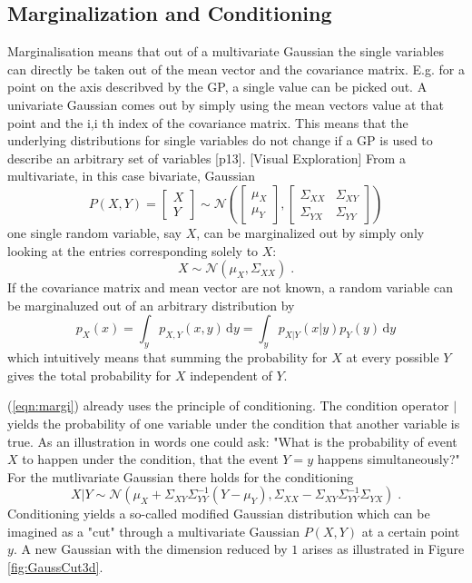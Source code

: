 \documentclass[%
  a4paper,oneside,%
  11pt,%
  smallchapters,
  green,%
  rgb, <cmyk>
  ,]{tubsbook}
\begin{document}
\subsection{Marginalization and Conditioning} 
Marginalisation means that out of a multivariate Gaussian the single variables can directly be taken out of the mean vector and the covariance matrix. E.g. for a point on the axis describved by the GP, a single value can be picked out. A univariate Gaussian comes out by simply using the mean vectors value at that point and the i,i th index of the covariance matrix. This means that the underlying distributions for single variables do not change if a GP is used to describe an arbitrary set of variables [p13].
[Visual Exploration]
From a multivariate, in this case bivariate, Gaussian
\begin{equation}
P(X,Y) = \begin{bmatrix}
           X \\
           Y
         \end{bmatrix} \sim \mathcal{N}\left( \begin{bmatrix}
           \mu_X \\
           \mu_Y
         \end{bmatrix}, \begin{bmatrix}
\Sigma_{XX} & \Sigma_{XY} \\
\Sigma_{YX} & \Sigma_{YY} 
\end{bmatrix}  \right)
\end{equation}
one single random variable, say $X$, can be marginalized out by simply only looking at the entries corresponding solely to $X$:
\begin{equation}
X \sim \mathcal{N}(\mu_X, \Sigma_{XX}) \;.
\end{equation}
If the covariance matrix and mean vector are not known, a random variable can be marginaluzed out of an arbitrary distribution by
\begin{equation}
p_X(x) = \int_y p_{X,Y}(x,y)\,\mathrm{d}y = \int_y p_{X|Y}(x|y)p_Y(y)\,\mathrm{d}y
\label{eqn:margi}
\end{equation}
which intuitively means that summing the probability for $X$ at every possible $Y$ gives the total probability for $X$ independent of $Y$. 

(\ref{eqn:margi}) already uses the principle of conditioning. The condition operator $|$ yields the probability of one variable under the condition that another variable is true. As an illustration in words one could ask: "What is the probability of event $X$ to happen under the condition, that the event $Y=y$ happens simultaneously?"
For the mutlivariate Gaussian there holds for the conditioning
\begin{equation}
X|Y \sim \mathcal{N}(\mu_X +\Sigma_{XY} \Sigma_{YY}^{-1}(Y-\mu_Y), \Sigma_{XX} - \Sigma_{XY}\Sigma_{YY}^{-1}\Sigma_{YX} ) \;.
\end{equation}
%
Conditioning yields a so-called modified Gaussian distribution which can be imagined as a "cut" through a multivariate Gaussian $P(X,Y)$ at a certain point $y$. A new Gaussian with the dimension reduced by $1$ arises as illustrated in Figure \ref{fig:GaussCut3d}.
\end{document}

